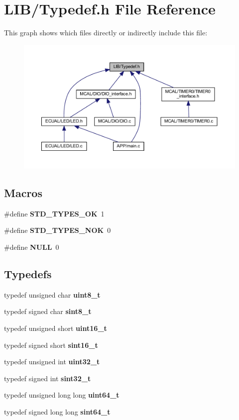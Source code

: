 \section{L\+I\+B/\+Typedef.h File Reference}
\label{_typedef_8h}
This graph shows which files directly or indirectly include this file\+:\nopagebreak
\begin{figure}[H]
\begin{center}
\leavevmode
\includegraphics[width=350pt]{_typedef_8h__dep__incl}
\end{center}
\end{figure}
\subsection*{Macros}
\begin{DoxyCompactItemize}
\item 
\#define \textbf{ S\+T\+D\+\_\+\+T\+Y\+P\+E\+S\+\_\+\+OK}~1
\item 
\#define \textbf{ S\+T\+D\+\_\+\+T\+Y\+P\+E\+S\+\_\+\+N\+OK}~0
\item 
\#define \textbf{ N\+U\+LL}~0
\end{DoxyCompactItemize}
\subsection*{Typedefs}
\begin{DoxyCompactItemize}
\item 
typedef unsigned char \textbf{ uint8\+\_\+t}
\item 
typedef signed char \textbf{ sint8\+\_\+t}
\item 
typedef unsigned short \textbf{ uint16\+\_\+t}
\item 
typedef signed short \textbf{ sint16\+\_\+t}
\item 
typedef unsigned int \textbf{ uint32\+\_\+t}
\item 
typedef signed int \textbf{ sint32\+\_\+t}
\item 
typedef unsigned long long \textbf{ uint64\+\_\+t}
\item 
typedef signed long long \textbf{ sint64\+\_\+t}
\end{DoxyCompactItemize}


